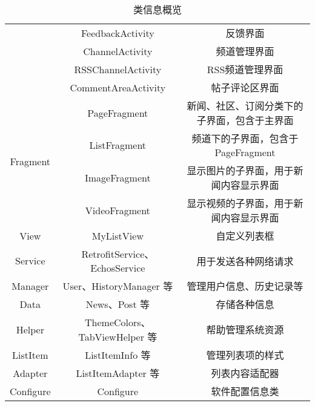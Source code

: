 \begin{table}[H]
{\begin{tabular}{|c|c|c|}
                               & FeedbackActivity             & 反馈界面                     \\ \cline{2-3} 
                               & ChannelActivity              & 频道管理界面                   \\ \cline{2-3} 
                               & RSSChannelActivity           & RSS频道管理界面                \\ \cline{2-3} 
                               & CommentAreaActivity          & 帖子评论区界面                  \\ \hline
    \multirow{4}{*}{Fragment}  & PageFragment                 & 新闻、社区、订阅分类下的子界面，包含于主界面   \\ \cline{2-3} 
                               & ListFragment                 & 频道下的子界面，包含于 PageFragment \\ \cline{2-3} 
                               & ImageFragment                & 显示图片的子界面，用于新闻内容显示界面      \\ \cline{2-3} 
                               & VideoFragment                & 显示视频的子界面，用于新闻内容显示界面      \\ \hline
    View                       & MyListView                   & 自定义列表框                   \\ \hline
    Service                    & RetrofitService、EchosService & 用于发送各种网络请求               \\ \hline
    Manager                    & User、HistoryManager 等        & 管理用户信息、历史记录等             \\ \hline
    Data                       & News、Post 等                  & 存储各种信息                   \\ \hline
    Helper                     & ThemeColors、TabViewHelper 等  & 帮助管理系统资源                 \\ \hline
    ListItem                   & ListItemInfo 等               & 管理列表项的样式                 \\ \hline
    Adapter                    & ListItemAdapter 等            & 列表内容适配器                  \\ \hline
    Configure                  & Configure                    & 软件配置信息类                  \\ \hline
    \end{tabular}}

    \caption{类信息概览}

\end{table}


